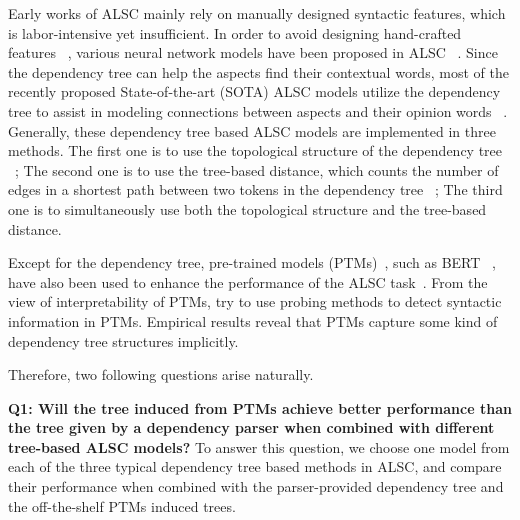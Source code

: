 \documentclass[11pt]{article}
\begin{document}
Early works of ALSC mainly rely on  manually designed syntactic features, which is labor-intensive yet insufficient. In order to avoid designing hand-crafted features ~\citep{DBLP:conf/acl/JiangYZLZ11,DBLP:conf/semeval/KiritchenkoZCM14}, various neural network models have been proposed in ALSC ~\citep{DBLP:conf/acl/DongWTTZX14,DBLP:conf/ijcai/VoZ15,DBLP:conf/emnlp/WangHZZ16,DBLP:conf/emnlp/ChenSBY17,DBLP:conf/coling/HeLND18,DBLP:conf/sigir/ZhangL019,DBLP:conf/acl/WangSYQW20}.
Since the dependency tree can help the aspects find their contextual words, most of the recently proposed State-of-the-art (SOTA) ALSC models utilize the dependency tree to assist in modeling connections between aspects and their opinion words ~\citep{DBLP:conf/acl/WangSYQW20,DBLP:conf/emnlp/SunZMML19,DBLP:conf/sigir/ZhangL019}. Generally, these dependency tree based ALSC models are implemented in three methods. The first one is to use the topological structure of the dependency tree ~\citep{DBLP:conf/acl/DongWTTZX14,DBLP:conf/emnlp/ZhangLS19,DBLP:conf/emnlp/HuangC19a,DBLP:conf/emnlp/SunZMML19,DBLP:conf/aaai/ZhengZMM20,DBLP:conf/acl/TangJLZ20}; The second one is to use the tree-based distance, which counts the number of edges in a shortest path  between two tokens in the dependency tree ~\citep{DBLP:conf/coling/HeLND18,DBLP:conf/sigir/ZhangL019,DBLP:conf/acl/PhanO20}; The third one is to simultaneously use both the topological structure and the tree-based distance.


Except for the dependency tree, pre-trained models (PTMs)~\citep{qiu2020:scts-ptms}, such as BERT ~\citep{DBLP:conf/naacl/DevlinCLT19}, have also been used to enhance the performance of the ALSC task~\citep{sun2019utilizing, DBLP:conf/acl/TangJLZ20,DBLP:conf/acl/PhanO20,DBLP:conf/acl/WangSYQW20}.
From the view of  interpretability of PTMs, \citet{DBLP:conf/conll/ChenTCCSZ19,DBLP:conf/naacl/HewittM19,DBLP:conf/acl/WuCKL20} try to use probing methods to detect syntactic information in  PTMs. Empirical results reveal that PTMs capture some kind of dependency tree structures  implicitly.


Therefore, two following questions arise naturally.

\textbf{Q1: Will the tree  induced from PTMs achieve better performance than the tree given by a dependency parser when combined with different tree-based ALSC models?}
To answer this question, we choose one model from each of the three typical dependency tree based methods in ALSC, and compare their performance when combined with the parser-provided dependency tree and the  off-the-shelf PTMs induced trees.
\end{document}
